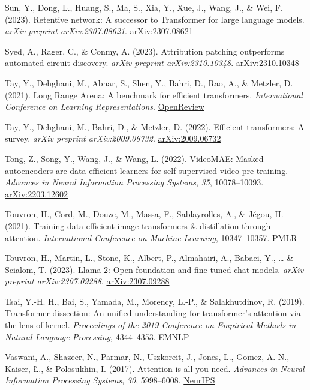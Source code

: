 \documentclass[10pt,twocolumn]{article}
\begin{document}
Sun, Y., Dong, L., Huang, S., Ma, S., Xia, Y., Xue, J., Wang, J., \& Wei, F. (2023). Retentive network: A successor to Transformer for large language models. \emph{arXiv preprint arXiv:2307.08621}. \href{https://arxiv.org/abs/2307.08621}{arXiv:2307.08621}

Syed, A., Rager, C., \& Conmy, A. (2023). Attribution patching outperforms automated circuit discovery. \emph{arXiv preprint arXiv:2310.10348}. \href{https://arxiv.org/abs/2310.10348}{arXiv:2310.10348}

Tay, Y., Dehghani, M., Abnar, S., Shen, Y., Bahri, D., Rao, A., \& Metzler, D. (2021). Long Range Arena: A benchmark for efficient transformers. \emph{International Conference on Learning Representations}. \href{https://openreview.net/forum?id=qVyeW-grC2k}{OpenReview}

Tay, Y., Dehghani, M., Bahri, D., \& Metzler, D. (2022). Efficient transformers: A survey. \emph{arXiv preprint arXiv:2009.06732}. \href{https://arxiv.org/abs/2009.06732}{arXiv:2009.06732}

Tong, Z., Song, Y., Wang, J., \& Wang, L. (2022). VideoMAE: Masked autoencoders are data-efficient learners for self-supervised video pre-training. \emph{Advances in Neural Information Processing Systems}, \emph{35}, 10078--10093. \href{https://arxiv.org/abs/2203.12602}{arXiv:2203.12602}

Touvron, H., Cord, M., Douze, M., Massa, F., Sablayrolles, A., \& Jégou, H. (2021). Training data-efficient image transformers \& distillation through attention. \emph{International Conference on Machine Learning}, 10347--10357. \href{https://proceedings.mlr.press/v139/touvron21a.html}{PMLR}

Touvron, H., Martin, L., Stone, K., Albert, P., Almahairi, A., Babaei, Y., \ldots{} \& Scialom, T. (2023). Llama 2: Open foundation and fine-tuned chat models. \emph{arXiv preprint arXiv:2307.09288}. \href{https://arxiv.org/abs/2307.09288}{arXiv:2307.09288}

Tsai, Y.-H. H., Bai, S., Yamada, M., Morency, L.-P., \& Salakhutdinov, R. (2019). Transformer dissection: An unified understanding for transformer's attention via the lens of kernel. \emph{Proceedings of the 2019 Conference on Empirical Methods in Natural Language Processing}, 4344--4353. \href{https://aclanthology.org/D19-1443}{EMNLP}

Vaswani, A., Shazeer, N., Parmar, N., Uszkoreit, J., Jones, L., Gomez, A. N., Kaiser, Ł., \& Polosukhin, I. (2017). Attention is all you need. \emph{Advances in Neural Information Processing Systems}, \emph{30}, 5998--6008. \href{https://papers.nips.cc/paper/7181-attention-is-all-you-need}{NeurIPS}
\end{document}
